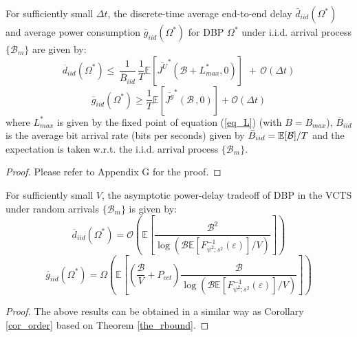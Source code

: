 \documentclass[11pt,journal, onecolumn]{./IEEEtran}
\newcommand{\blue}{\color{black}}
\newcommand{\red}{\color{black}}
\begin{document}
\begin{Theorem}\label{the_rbound}{\red For sufficiently small $\Delta t$,} the discrete-time average end-to-end delay $\bar d_{iid}(\Omega^*)$ and average power consumption $\bar g_{iid}(\Omega^*)$ for DBP $\Omega^*$ under i.i.d. arrival process $\{\mathcal B_m\}$ are given by:
\begin{equation}\label{eq_dupr}
\overline d_{iid} \left( {{\Omega ^*}} \right) \le \,\frac{1}{{\overline B_{iid} }}\,\frac{1}{T}\mathbb{E}[{\overline {{J^U}} ^*}(\mathcal{B} + {L^*_{max}},0)]\,\, + \,\mathcal O\left( {{\Delta t}} \right)
\end{equation}
\begin{equation}\label{eq_plowr}
\overline g_{iid} \left( {{\Omega ^*}} \right) \ge \frac{1}{T} \mathbb{E}[{\overline {{J^g}} ^*}(\mathcal B \,,0)]+ \mathcal O\left( {{\Delta t}} \right)
\end{equation}
where $L_{max}^*$ is given by the fixed point of equation (\ref{eq_L}) (with $B=B_{max}$), ${\overline B_{iid}}$ is the average bit arrival rate (bits per seconds) given by ${{\bar B}_{iid}}= {\mathbb E}[{{\cal B}}]/T$ and the expectation is taken w.r.t. the i.i.d. arrival process $\{\mathcal B_m\}$. ~\hfill\IEEEQED
\end{Theorem}
\begin{proof}
Please refer to Appendix G for the proof.
\end{proof}
\begin{Corollary}\label{cor_orderr}
{\red For sufficiently small $V$,} the asymptotic power-delay tradeoff of DBP {\blue in the VCTS} under random arrivals $\{\mathcal B_m\}$ is given by:
\begin{equation}\label{eq_dorder}
\overline d_{iid} \left( {{\Omega ^*}} \right) = \mathcal{O} \left( {\mathbb E\left[ {\frac{{{\mathcal B^2}}}{{\log ({\mathcal B }\mathbb{E}[F _{{\psi ^2};{s^2}}^{ - 1}({\varepsilon})]/V)}}} \right]} \right)
\end{equation}
\begin{equation}\label{eq_gorder}
\overline g_{iid} \left( {{\Omega ^*}} \right)  =\Omega \left( {\mathbb E\left[ {\left( {\frac{{{\mathcal B }}}{V} + {P_{cct}}} \right)\frac{\mathcal B}{{ \log ({\mathcal B }\mathbb{E}[F _{{\psi ^2};{s^2}}^{ - 1}({\varepsilon})]/V)}}} \right]} \right)
\end{equation}
\end{Corollary}
\begin{proof}The above results can be obtained in a similar way as Corollary \ref{cor_order} based on Theorem \ref{the_rbound}.
\end{proof}
\end{document}
